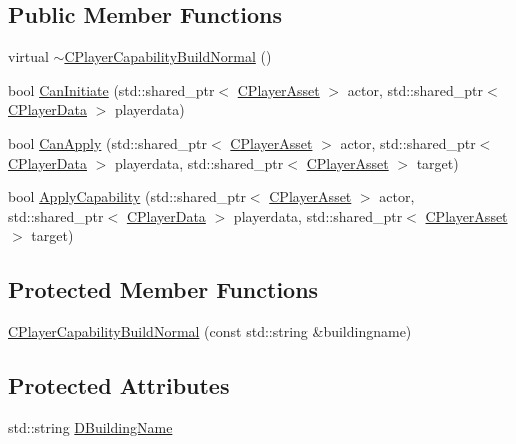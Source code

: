 \subsection*{Public Member Functions}
\begin{DoxyCompactItemize}
\item 
virtual \hyperlink{classCPlayerCapabilityBuildNormal_aed39be621a98ed6d1aaf470cd5bf1ff5}{$\sim$\+C\+Player\+Capability\+Build\+Normal} ()
\item 
bool \hyperlink{classCPlayerCapabilityBuildNormal_a5487e5521779846198604e8ebadaf283}{Can\+Initiate} (std\+::shared\+\_\+ptr$<$ \hyperlink{classCPlayerAsset}{C\+Player\+Asset} $>$ actor, std\+::shared\+\_\+ptr$<$ \hyperlink{classCPlayerData}{C\+Player\+Data} $>$ playerdata)
\item 
bool \hyperlink{classCPlayerCapabilityBuildNormal_a1a8c6fdd9d8a91ecb7417163279e2276}{Can\+Apply} (std\+::shared\+\_\+ptr$<$ \hyperlink{classCPlayerAsset}{C\+Player\+Asset} $>$ actor, std\+::shared\+\_\+ptr$<$ \hyperlink{classCPlayerData}{C\+Player\+Data} $>$ playerdata, std\+::shared\+\_\+ptr$<$ \hyperlink{classCPlayerAsset}{C\+Player\+Asset} $>$ target)
\item 
bool \hyperlink{classCPlayerCapabilityBuildNormal_afc2fbda17580385a4028d44cd03c9149}{Apply\+Capability} (std\+::shared\+\_\+ptr$<$ \hyperlink{classCPlayerAsset}{C\+Player\+Asset} $>$ actor, std\+::shared\+\_\+ptr$<$ \hyperlink{classCPlayerData}{C\+Player\+Data} $>$ playerdata, std\+::shared\+\_\+ptr$<$ \hyperlink{classCPlayerAsset}{C\+Player\+Asset} $>$ target)
\end{DoxyCompactItemize}
\subsection*{Protected Member Functions}
\begin{DoxyCompactItemize}
\item 
\hyperlink{classCPlayerCapabilityBuildNormal_a36157bf1a2875f0831b646dd2313a464}{C\+Player\+Capability\+Build\+Normal} (const std\+::string \&buildingname)
\end{DoxyCompactItemize}
\subsection*{Protected Attributes}
\begin{DoxyCompactItemize}
\item 
std\+::string \hyperlink{classCPlayerCapabilityBuildNormal_aae09d6cee5f8e201a0139c9065a5577c}{D\+Building\+Name}
\end{DoxyCompactItemize}
